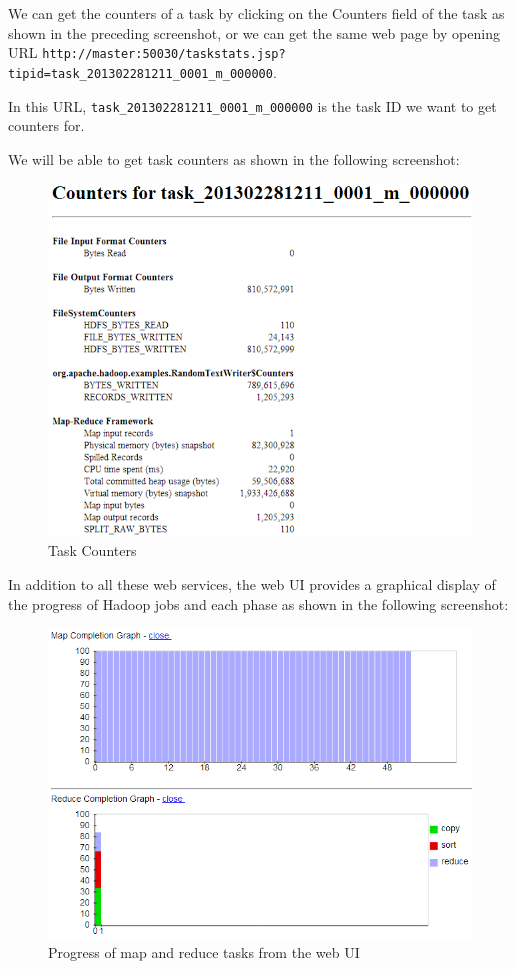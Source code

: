 We can get the counters of a task by clicking on the Counters field of the task as shown in the preceding screenshot, or we can get the same web page by opening URL \verb|http://master:50030/taskstats.jsp?tipid=task_201302281211_0001_m_000000|.

In this URL, \verb|task_201302281211_0001_m_000000| is the task ID we want to get counters for.

We will be able to get task counters as shown in the following screenshot: 
\begin{figure}[h]
  \centering
  \includegraphics[width=.8\textwidth]{figs/5163OS_04_05.png}
  \caption{Task Counters}\label{fig:task.counters}
\end{figure} 

In addition to all these web services, the web UI provides a graphical display of the progress of Hadoop jobs and each phase as shown in the following screenshot: \\
\begin{figure}[h]
  \centering
  \includegraphics[width=.8\textwidth]{figs/5163OS_04_06.png}
  \caption{Progress of map and reduce tasks from the web UI}\label{fig:mapreduce.progress}
\end{figure} 


